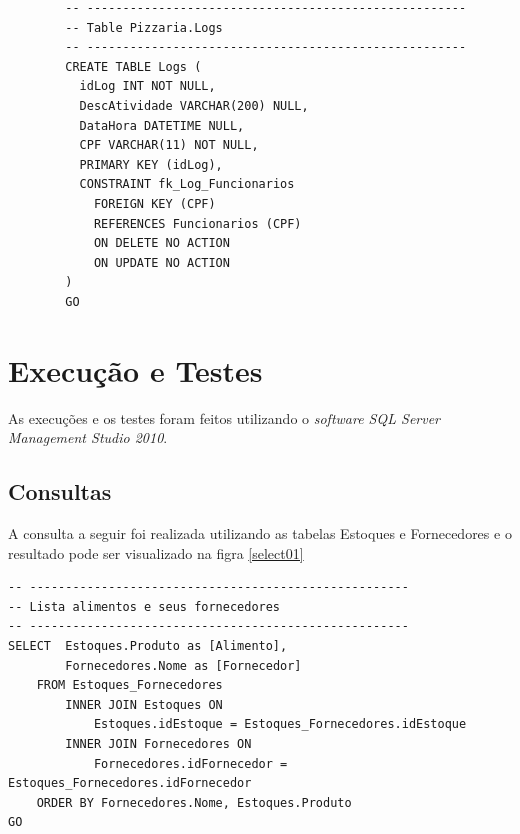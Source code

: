 \documentclass[
	12pt,				%
	openright,			%
	oneside,			%
	a4paper,			%
	chapter=TITLE,		%
	section=TITLE,		%
	english,			%
	brazil				%
	]{abntex2}
\begin{document}
\begin{lstlisting}
        -- -----------------------------------------------------
        -- Table Pizzaria.Logs
        -- -----------------------------------------------------
        CREATE TABLE Logs (
          idLog INT NOT NULL,
          DescAtividade VARCHAR(200) NULL,
          DataHora DATETIME NULL,
          CPF VARCHAR(11) NOT NULL,
          PRIMARY KEY (idLog),
          CONSTRAINT fk_Log_Funcionarios
            FOREIGN KEY (CPF)
            REFERENCES Funcionarios (CPF)
            ON DELETE NO ACTION
            ON UPDATE NO ACTION
        )
        GO
    \end{lstlisting}

\chapter {Execução e Testes}
    As execuções e os testes foram feitos utilizando o \textit{software SQL Server Management Studio 2010}.
    
\section{Consultas}
    A consulta a seguir foi realizada utilizando as tabelas Estoques e Fornecedores 
    e o resultado pode ser visualizado na figra \ref{select01}
    \begin{lstlisting}
-- -----------------------------------------------------
-- Lista alimentos e seus fornecedores
-- -----------------------------------------------------    
SELECT  Estoques.Produto as [Alimento], 
        Fornecedores.Nome as [Fornecedor] 
    FROM Estoques_Fornecedores
	    INNER JOIN Estoques ON 
	        Estoques.idEstoque = Estoques_Fornecedores.idEstoque 
	    INNER JOIN Fornecedores ON 
	        Fornecedores.idFornecedor = Estoques_Fornecedores.idFornecedor
	ORDER BY Fornecedores.Nome, Estoques.Produto
GO      
    \end{lstlisting}
    
\end{document}

